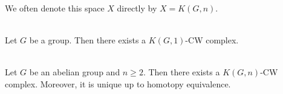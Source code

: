\documentclass[a4paper]{article}
\begin{document}
We often denote this space $X$ directly by $X=K(G,n)$. 

\begin{prp}{}{}\\
Let $G$ be a group. Then there exists a $K(G,1)$-CW complex. 
\end{prp}

\begin{prp}{}{}\\
Let $G$ be an abelian group and $n\geq 2$. Then there exists a $K(G,n)$-CW complex. Moreover, it is unique up to homotopy equivalence. 
\end{prp}
\end{document}
